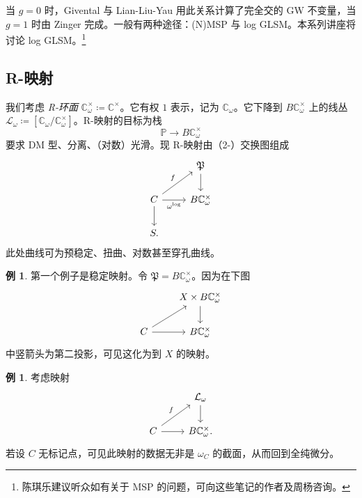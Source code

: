 \documentclass{amsart}
\theoremstyle{definition}
\newtheorem{exm}[thm]{例}
\theoremstyle{remark}
\theoremstyle{plain}
\theoremstyle{definition}
\theoremstyle{remark}
\newcommand{\C}{\mathbb{C}}
\renewcommand{\P}{\mathbb{P}}
\newcommand{\mc}[1]{\mathcal{#1}}
\newcommand{\mf}[1]{\mathfrak{#1}}
\newcommand{\1}{\mathbf{1}}
\newcommand{\2}{\mathbf{2}}
\newcommand{\3}{\mathbf{3}}
\begin{document}
当 \(g = 0\) 时，Givental 与 Lian-Liu-Yau 用此关系计算了完全交的 GW 不变量，当 \(g = 1\) 时由 Zinger 完成。一般有两种途径：(N)MSP 与 log GLSM。本系列讲座将讨论 log GLSM。\footnote{陈琪乐建议听众如有关于 MSP 的问题，可向这些笔记的作者及周杨咨询。}

\subsection{R-映射}%
\label{sub:R-maps}

我们考虑 \textit{R-环面} \(\C^{\times}_{\omega} \coloneqq \C^{\times}\)。它有权 \(1\) 表示，记为 \(\C_{\omega}\)。它下降到 \(B \C_{\omega}^{\times}\) 上的线丛 \(\mc{L}_{\omega} \coloneqq [\C_{\omega} / \C^{\times}_{\omega}]\)。R-映射的目标为栈
\[ \P \to B \C^{\times}_{\omega} \]
要求 DM 型、分离、（对数）光滑。现 R-映射由（2-）交换图组成
\begin{equation*}
\begin{tikzcd}
    & \mf{P} \ar{d} \\
    C \ar{ur}{f} \ar{r}[swap]{\omega^{\log}} \ar{d} & B \C_{\omega}^{\times} \\
    S.
\end{tikzcd}
\end{equation*}
此处曲线可为预稳定、扭曲、对数甚至穿孔曲线。

\begin{exm}
    第一个例子是稳定映射。令 \(\mf{P} = B\C_{\omega}^{\times}\)。因为在下图
    \begin{equation*}
    \begin{tikzcd}
        & X \times B\C_{\omega}^{\times} \ar{d} \\
        C \ar{ur} \ar{r} & B \C_{\omega}^{\times}
    \end{tikzcd}
    \end{equation*}
    中竖箭头为第二投影，可见这化为到 \(X\) 的映射。
\end{exm}

\begin{exm}
    考虑映射
    \begin{equation*}
    \begin{tikzcd}
        & \mc{L}_{\omega} \ar{d} \\
        C \ar{ur}{f} \ar{r} & B \C_{\omega}^{\times}.
    \end{tikzcd}
    \end{equation*}
    若设 \(C\) 无标记点，可见此映射的数据无非是 \(\omega_C\) 的截面，从而回到全纯微分。
\end{exm}
\end{document}
